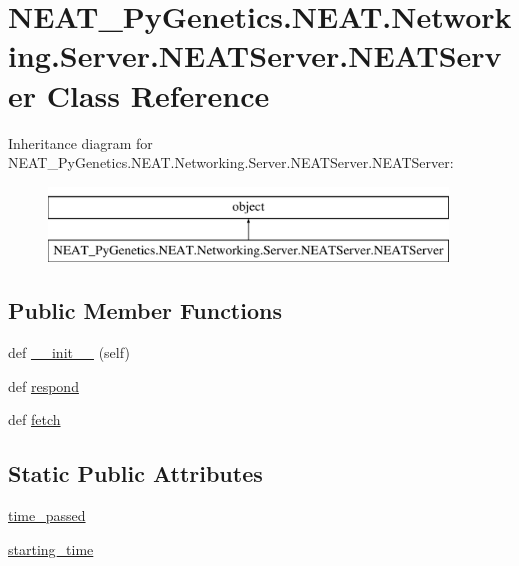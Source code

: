 \hypertarget{classNEAT__PyGenetics_1_1NEAT_1_1Networking_1_1Server_1_1NEATServer_1_1NEATServer}{}\section{N\+E\+A\+T\+\_\+\+Py\+Genetics.\+N\+E\+A\+T.\+Networking.\+Server.\+N\+E\+A\+T\+Server.\+N\+E\+A\+T\+Server Class Reference}
\label{classNEAT__PyGenetics_1_1NEAT_1_1Networking_1_1Server_1_1NEATServer_1_1NEATServer}
Inheritance diagram for N\+E\+A\+T\+\_\+\+Py\+Genetics.\+N\+E\+A\+T.\+Networking.\+Server.\+N\+E\+A\+T\+Server.\+N\+E\+A\+T\+Server\+:\begin{figure}[H]
\begin{center}
\leavevmode
\includegraphics[height=2.000000cm]{classNEAT__PyGenetics_1_1NEAT_1_1Networking_1_1Server_1_1NEATServer_1_1NEATServer}
\end{center}
\end{figure}
\subsection*{Public Member Functions}
\begin{DoxyCompactItemize}
\item 
def \hyperlink{classNEAT__PyGenetics_1_1NEAT_1_1Networking_1_1Server_1_1NEATServer_1_1NEATServer_a45eb9c4003d9e0f4ae9c0e239423ddad}{\+\_\+\+\_\+init\+\_\+\+\_\+} (self)
\item 
def \hyperlink{classNEAT__PyGenetics_1_1NEAT_1_1Networking_1_1Server_1_1NEATServer_1_1NEATServer_a44ffcc6f56d71844827bd402bf4f0e63}{respond}
\item 
def \hyperlink{classNEAT__PyGenetics_1_1NEAT_1_1Networking_1_1Server_1_1NEATServer_1_1NEATServer_adf4c43680aa89998cf65bc6499f778a8}{fetch}
\end{DoxyCompactItemize}
\subsection*{Static Public Attributes}
\begin{DoxyCompactItemize}
\item 
\hyperlink{classNEAT__PyGenetics_1_1NEAT_1_1Networking_1_1Server_1_1NEATServer_1_1NEATServer_acbbd8416ba0d7139131ff0e553b20c3d}{time\+\_\+passed}
\item 
\hyperlink{classNEAT__PyGenetics_1_1NEAT_1_1Networking_1_1Server_1_1NEATServer_1_1NEATServer_abba58b32d9919608f5502e001dbd62dd}{starting\+\_\+time}
\end{DoxyCompactItemize}



